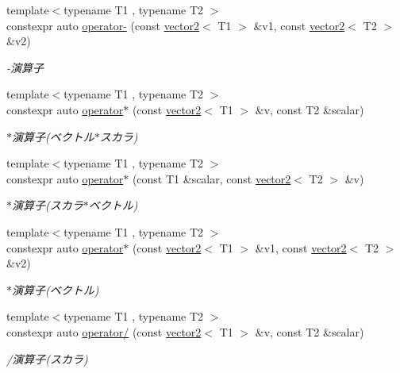 \begin{DoxyCompactItemize}
{\footnotesize template$<$typename T1 , typename T2 $>$ }\\constexpr auto \mbox{\hyperlink{namespacesaki_ab08546185e6a03ba6496daf21d943799}{operator-\/}} (const \mbox{\hyperlink{classsaki_1_1vector2}{vector2}}$<$ T1 $>$ \&v1, const \mbox{\hyperlink{classsaki_1_1vector2}{vector2}}$<$ T2 $>$ \&v2)
\begin{DoxyCompactList}\small\item\em -\/演算子 \end{DoxyCompactList}\item 
{\footnotesize template$<$typename T1 , typename T2 $>$ }\\constexpr auto \mbox{\hyperlink{namespacesaki_af6d6668922b972ec01303867612e4783}{operator$\ast$}} (const \mbox{\hyperlink{classsaki_1_1vector2}{vector2}}$<$ T1 $>$ \&v, const T2 \&scalar)
\begin{DoxyCompactList}\small\item\em $\ast$演算子(ベクトル$\ast$スカラ) \end{DoxyCompactList}\item 
{\footnotesize template$<$typename T1 , typename T2 $>$ }\\constexpr auto \mbox{\hyperlink{namespacesaki_a7d5d04727e813b089aadf4b97247b64a}{operator$\ast$}} (const T1 \&scalar, const \mbox{\hyperlink{classsaki_1_1vector2}{vector2}}$<$ T2 $>$ \&v)
\begin{DoxyCompactList}\small\item\em $\ast$演算子(スカラ$\ast$ベクトル) \end{DoxyCompactList}\item 
{\footnotesize template$<$typename T1 , typename T2 $>$ }\\constexpr auto \mbox{\hyperlink{namespacesaki_a1db47b2e2e0826325ae66ee6216ba5fc}{operator$\ast$}} (const \mbox{\hyperlink{classsaki_1_1vector2}{vector2}}$<$ T1 $>$ \&v1, const \mbox{\hyperlink{classsaki_1_1vector2}{vector2}}$<$ T2 $>$ \&v2)
\begin{DoxyCompactList}\small\item\em $\ast$演算子(ベクトル) \end{DoxyCompactList}\item 
{\footnotesize template$<$typename T1 , typename T2 $>$ }\\constexpr auto \mbox{\hyperlink{namespacesaki_ab12f7d971656317d7e0502bf64fe762a}{operator/}} (const \mbox{\hyperlink{classsaki_1_1vector2}{vector2}}$<$ T1 $>$ \&v, const T2 \&scalar)
\begin{DoxyCompactList}\small\item\em /演算子(スカラ) \end{DoxyCompactList}\item 

\end{DoxyCompactItemize}
